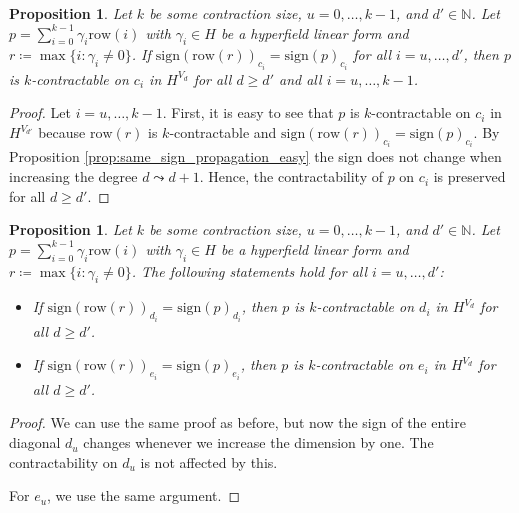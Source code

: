 \documentclass[11pt]{article}
\newtheorem{proposition}[theorem]{Proposition}
\begin{document}
\begin{proposition}\label{prop:fixed-contraction-homo-row}
  Let $k$ be some contraction size, $u = 0, \dots, k -1$, and $d' \in \mathbb{N}$. Let $p = \sum_{i=0}^{k-1} \gamma_{i} \mathrm{row}(i)$ with $\gamma_{i} \in H$ be a hyperfield linear form and $r \coloneqq \max\{ i : \gamma_{i} \neq 0 \}$. If $\mathrm{sign}(\mathrm{row}(r))_{c_i} = \mathrm{sign}(p)_{c_i}$ for all \( i = u, \dots, d'\), then $p$ is $k$-contractable on $c_{i}$ in $H^{V_{d}}$ for all $d \geq d'$ and all \( i=u, \dots, k-1 \).  
\end{proposition}

\begin{proof}
  Let \( i = u, \dots, k-1 \).
  First, it is easy to see that \( p \) is \( k \)-contractable on \( c_i \) in \( H^{V_{d'}} \) because \( \mathrm{row}(r) \) is \( k \)-contractable and \( \mathrm{sign}(\mathrm{row}(r))_{c_i} = \mathrm{sign}(p)_{c_i} \). By Proposition \ref{prop:same_sign_propagation_easy} the sign does not change when increasing the degree \( d \leadsto d+1 \). Hence, the contractability of \( p \) on \( c_i \) is preserved for all \( d \geq d' \).
\end{proof}


\begin{proposition}
  Let $k$ be some contraction size, $u = 0, \dots, k -1$, and $d' \in \mathbb{N}$. Let $p = \sum_{i=0}^{k-1} \gamma_{i} \mathrm{row}(i)$ with $\gamma_{i} \in H$ be a hyperfield linear form and $r \coloneqq \max\{ i : \gamma_{i} \neq 0 \}$. The following statements hold for all \( i = u, \dots, d'\):


  \begin{itemize}
    \item If $\mathrm{sign}(\mathrm{row}(r))_{d_i} = \mathrm{sign}(p)_{d_i}$, then $p$ is $k$-contractable on $d_{i}$ in $H^{V_{d}}$ for all $d \geq d'$.
    \item If $\mathrm{sign}(\mathrm{row}(r))_{e_i} = \mathrm{sign}(p)_{e_i}$, then $p$ is $k$-contractable on $e_{i}$ in $H^{V_{d}}$ for all $d \geq d'$.
  \end{itemize}
\end{proposition}

\begin{proof}
  We can use the same proof as before, but now the sign of the entire diagonal $d_{u}$ changes whenever we increase the dimension by one. The contractability on $d_{u}$ is not affected by this. 

  For $e_{u}$, we use the same argument. 
\end{proof}
\end{document}
